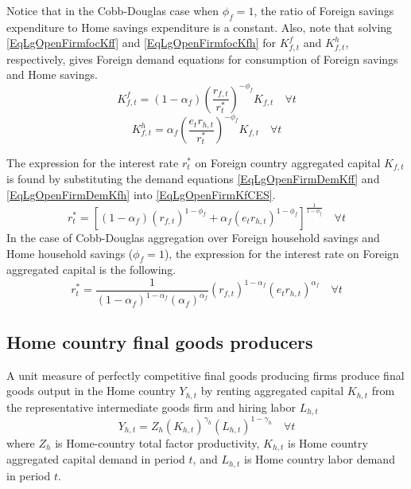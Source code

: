     Notice that in the Cobb-Douglas case when $\phi_f=1$, the ratio of Foreign savings expenditure to Home savings expenditure is a constant. Also, note that solving \eqref{EqLgOpenFirmfocKff} and \eqref{EqLgOpenFirmfocKfh} for $K^f_{f,t}$ and $K^h_{f,t}$, respectively, gives Foreign demand equations for consumption of Foreign savings and Home savings.
    \begin{equation}\label{EqLgOpenFirmDemKff}
      K^f_{f,t} = (1-\alpha_f)\left(\frac{r_{f,t}}{r^*_t}\right)^{-\phi_f}K_{f,t} \quad\forall t
    \end{equation}
    \begin{equation}\label{EqLgOpenFirmDemKfh}
      K^h_{f,t} = \alpha_f \left(\frac{e_t r_{h,t}}{r^*_t}\right)^{-\phi_f}K_{f,t} \quad\forall t
    \end{equation}

    The expression for the interest rate $r^*_t$ on Foreign country aggregated capital $K_{f,t}$ is found by substituting the demand equations \eqref{EqLgOpenFirmDemKff} and \eqref{EqLgOpenFirmDemKfh} into \eqref{EqLgOpenFirmKfCES}.
    \begin{equation}\label{EqLgOpenFirmAggR_f}
      r^*_t = \left[(1-\alpha_f)\left(r_{f,t}\right)^{1-\phi_f} + \alpha_f \left(e_t r_{h,t}\right)^{1-\phi_f}\right]^{\frac{1}{1-\phi_f}} \quad\forall t
    \end{equation}
    In the case of Cobb-Douglas aggregation over Foreign household savings and Home household savings ($\phi_f=1$), the expression for the interest rate on Foreign aggregated capital is the following.
    \begin{equation}\label{EqLgOpenFirmAggR_f_Cobb}
      r^*_t = \frac{1}{(1-\alpha_f)^{1-\alpha_f}(\alpha_f)^{\alpha_f}} \left(r_{f,t}\right)^{1-\alpha_f}\left(e_t r_{h,t}\right)^{\alpha_f} \quad\forall t
    \end{equation}


  \subsection{Home country final goods producers}\label{SecLgOpenFirmFinal_H}

    A unit measure of perfectly competitive final goods producing firms produce final goods output in the Home country $Y_{h,t}$ by renting aggregated capital $K_{h,t}$ from the representative intermediate goods firm and hiring labor $L_{h,t}$
    \begin{equation}\label{EqLgOpenProdFunc_H}
      Y_{h,t} = Z_h \left(K_{h,t}\right)^{\gamma_h}\left(L_{h,t}\right)^{1-\gamma_h} \quad\forall t
    \end{equation}
    where $Z_h$ is Home-country total factor productivity, $K_{h,t}$ is Home country aggregated capital demand in period $t$, and $L_{h,t}$ is Home country labor demand in period $t$.

